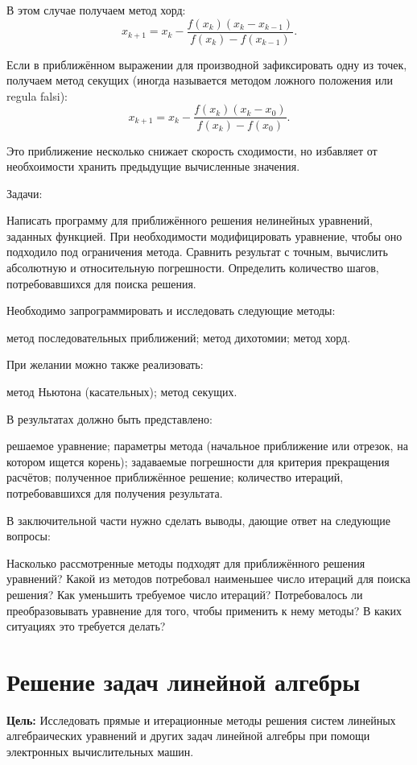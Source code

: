 В этом случае получаем метод хорд:
\[
x_{k+1}=x_{k}-\frac{f(x_{k})(x_{k}-x_{k-1})}{f(x_{k})-f(x_{k-1})}.
\]


Если в приближённом выражении для производной зафиксировать одну из
точек, получаем метод секущих (иногда называется методом ложного положения
или regula falsi):
\[
x_{k+1}=x_{k}-\frac{f(x_{k})(x_{k}-x_{0})}{f(x_{k})-f(x_{0})}.
\]


Это приближение несколько снижает скорость сходимости, но избавляет
от необхоимости хранить предыдущие вычисленные значения.

Задачи:

Написать программу для приближённого решения нелинейных уравнений,
заданных функцией. При необходимости модифицировать уравнение, чтобы
оно подходило под ограничения метода. Сравнить результат с точным,
вычислить абсолютную и относительную погрешности. Определить количество
шагов, потребовавшихся для поиска решения.

Необходимо запрограммировать и исследовать следующие методы:

метод последовательных приближений; метод дихотомии; метод хорд.

При желании можно также реализовать:

метод Ньютона (касательных); метод секущих.

В результатах должно быть представлено:

решаемое уравнение; параметры метода (начальное приближение или отрезок,
на котором ищется корень); задаваемые погрешности для критерия прекращения
расчётов; полученное приближённое решение; количество итераций, потребовавшихся
для получения результата.

В заключительной части нужно сделать выводы, дающие ответ на следующие
вопросы:

Насколько рассмотренные методы подходят для приближённого решения
уравнений? Какой из методов потребовал наименьшее число итераций для
поиска решения? Как уменьшить требуемое число итераций? Потребовалось
ли преобразовывать уравнение для того, чтобы применить к нему методы?
В каких ситуациях это требуется делать?

\newpage{}


\section{Решение задач линейной алгебры}

\noindent \textbf{Цель:} Исследовать прямые и итерационные методы
решения систем линейных алгебраических уравнений и других задач линейной
алгебры при помощи электронных вычислительных машин.

